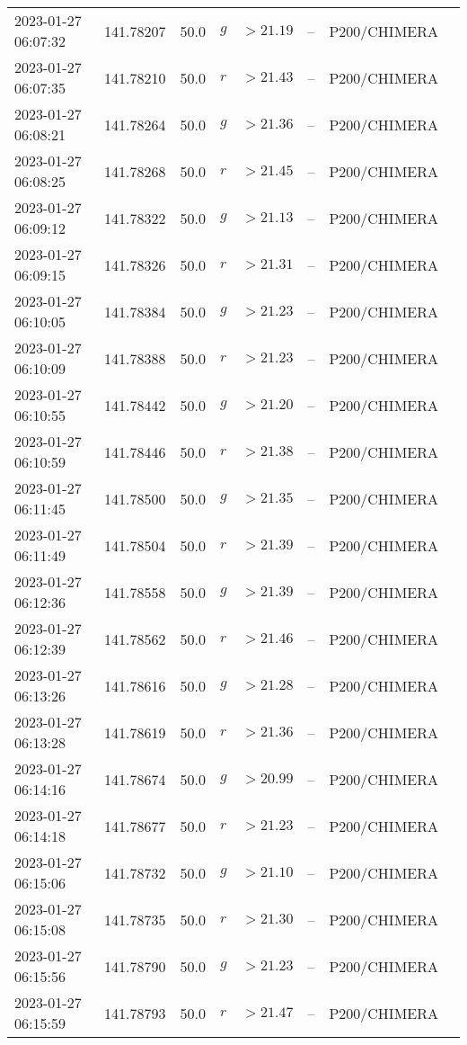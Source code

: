 \documentclass{nature_plusfigure}
\begin{document}
\begin{supplement}
\begin{center}
\begin{longtable}{llllllll}
2023-01-27 06:07:32 & 141.78207 & 50.0 & $g$ & $>21.19$ & -- & P200/CHIMERA &  \\ 
2023-01-27 06:07:35 & 141.78210 & 50.0 & $r$ & $>21.43$ & -- & P200/CHIMERA &  \\ 
2023-01-27 06:08:21 & 141.78264 & 50.0 & $g$ & $>21.36$ & -- & P200/CHIMERA &  \\ 
2023-01-27 06:08:25 & 141.78268 & 50.0 & $r$ & $>21.45$ & -- & P200/CHIMERA &  \\ 
2023-01-27 06:09:12 & 141.78322 & 50.0 & $g$ & $>21.13$ & -- & P200/CHIMERA &  \\ 
2023-01-27 06:09:15 & 141.78326 & 50.0 & $r$ & $>21.31$ & -- & P200/CHIMERA &  \\ 
2023-01-27 06:10:05 & 141.78384 & 50.0 & $g$ & $>21.23$ & -- & P200/CHIMERA &  \\ 
2023-01-27 06:10:09 & 141.78388 & 50.0 & $r$ & $>21.23$ & -- & P200/CHIMERA &  \\ 
2023-01-27 06:10:55 & 141.78442 & 50.0 & $g$ & $>21.20$ & -- & P200/CHIMERA &  \\ 
2023-01-27 06:10:59 & 141.78446 & 50.0 & $r$ & $>21.38$ & -- & P200/CHIMERA &  \\ 
2023-01-27 06:11:45 & 141.78500 & 50.0 & $g$ & $>21.35$ & -- & P200/CHIMERA &  \\ 
2023-01-27 06:11:49 & 141.78504 & 50.0 & $r$ & $>21.39$ & -- & P200/CHIMERA &  \\ 
2023-01-27 06:12:36 & 141.78558 & 50.0 & $g$ & $>21.39$ & -- & P200/CHIMERA &  \\ 
2023-01-27 06:12:39 & 141.78562 & 50.0 & $r$ & $>21.46$ & -- & P200/CHIMERA &  \\ 
2023-01-27 06:13:26 & 141.78616 & 50.0 & $g$ & $>21.28$ & -- & P200/CHIMERA &  \\ 
2023-01-27 06:13:28 & 141.78619 & 50.0 & $r$ & $>21.36$ & -- & P200/CHIMERA &  \\ 
2023-01-27 06:14:16 & 141.78674 & 50.0 & $g$ & $>20.99$ & -- & P200/CHIMERA &  \\ 
2023-01-27 06:14:18 & 141.78677 & 50.0 & $r$ & $>21.23$ & -- & P200/CHIMERA &  \\ 
2023-01-27 06:15:06 & 141.78732 & 50.0 & $g$ & $>21.10$ & -- & P200/CHIMERA &  \\ 
2023-01-27 06:15:08 & 141.78735 & 50.0 & $r$ & $>21.30$ & -- & P200/CHIMERA &  \\ 
2023-01-27 06:15:56 & 141.78790 & 50.0 & $g$ & $>21.23$ & -- & P200/CHIMERA &  \\ 
2023-01-27 06:15:59 & 141.78793 & 50.0 & $r$ & $>21.47$ & -- & P200/CHIMERA &  \\ 

\end{longtable}
\end{center}
\end{supplement}
\end{document}
